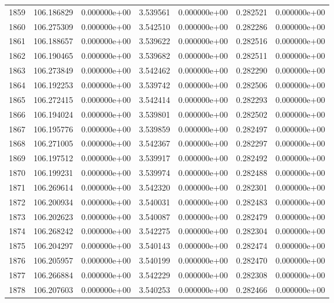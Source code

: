 \begin{tabular}{rrrrrrr}
1859 & 106.186829 &  0.000000e+00 &  3.539561 &  0.000000e+00 &    0.282521 &  0.000000e+00 \\
1860 & 106.275309 &  0.000000e+00 &  3.542510 &  0.000000e+00 &    0.282286 &  0.000000e+00 \\
1861 & 106.188657 &  0.000000e+00 &  3.539622 &  0.000000e+00 &    0.282516 &  0.000000e+00 \\
1862 & 106.190465 &  0.000000e+00 &  3.539682 &  0.000000e+00 &    0.282511 &  0.000000e+00 \\
1863 & 106.273849 &  0.000000e+00 &  3.542462 &  0.000000e+00 &    0.282290 &  0.000000e+00 \\
1864 & 106.192253 &  0.000000e+00 &  3.539742 &  0.000000e+00 &    0.282506 &  0.000000e+00 \\
1865 & 106.272415 &  0.000000e+00 &  3.542414 &  0.000000e+00 &    0.282293 &  0.000000e+00 \\
1866 & 106.194024 &  0.000000e+00 &  3.539801 &  0.000000e+00 &    0.282502 &  0.000000e+00 \\
1867 & 106.195776 &  0.000000e+00 &  3.539859 &  0.000000e+00 &    0.282497 &  0.000000e+00 \\
1868 & 106.271005 &  0.000000e+00 &  3.542367 &  0.000000e+00 &    0.282297 &  0.000000e+00 \\
1869 & 106.197512 &  0.000000e+00 &  3.539917 &  0.000000e+00 &    0.282492 &  0.000000e+00 \\
1870 & 106.199231 &  0.000000e+00 &  3.539974 &  0.000000e+00 &    0.282488 &  0.000000e+00 \\
1871 & 106.269614 &  0.000000e+00 &  3.542320 &  0.000000e+00 &    0.282301 &  0.000000e+00 \\
1872 & 106.200934 &  0.000000e+00 &  3.540031 &  0.000000e+00 &    0.282483 &  0.000000e+00 \\
1873 & 106.202623 &  0.000000e+00 &  3.540087 &  0.000000e+00 &    0.282479 &  0.000000e+00 \\
1874 & 106.268242 &  0.000000e+00 &  3.542275 &  0.000000e+00 &    0.282304 &  0.000000e+00 \\
1875 & 106.204297 &  0.000000e+00 &  3.540143 &  0.000000e+00 &    0.282474 &  0.000000e+00 \\
1876 & 106.205957 &  0.000000e+00 &  3.540199 &  0.000000e+00 &    0.282470 &  0.000000e+00 \\
1877 & 106.266884 &  0.000000e+00 &  3.542229 &  0.000000e+00 &    0.282308 &  0.000000e+00 \\
1878 & 106.207603 &  0.000000e+00 &  3.540253 &  0.000000e+00 &    0.282466 &  0.000000e+00 \\

\end{tabular}

